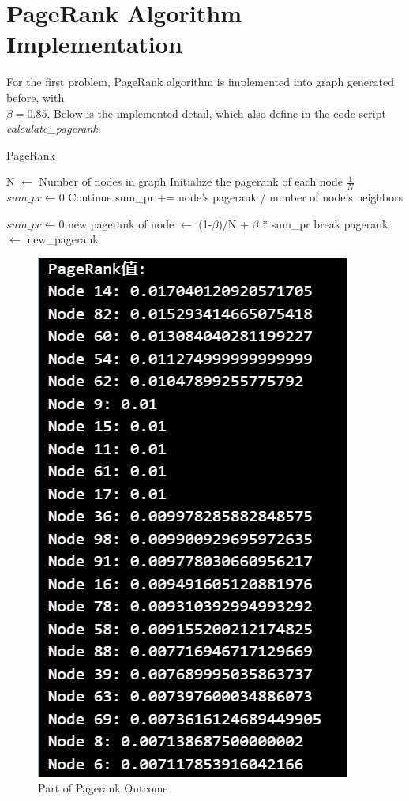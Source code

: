 \documentclass{article}
\begin{document}
	\section*{PageRank Algorithm Implementation}
	For the first problem, PageRank algorithm is implemented into graph generated before, with \\$\beta = 0.85$. Below is the implemented detail, which also define in the code script \textit{calculate\_pagerank}:\\
	
	\begin{algorithm}
		\caption{PageRank}\label{alg:pagerank}
		\begin{algorithmic}
			\State N $\gets $ Number of nodes in graph
			\State Initialize the pagerank of each node $\frac{1}{N}$
					\State $sum\_pr \gets 0$ 
								\State Continue
							\EndIf
							\State sum\_pr += node's pagerank / number of node's neighbors
						
						\EndFor
					\Else
						\State $sum\_pc \gets 0$
					\EndIf
				\State new pagerank of node $\gets$ (1-$\beta$)/N + $\beta$ * sum\_pr
				\EndFor
				\State break
			\EndIf
			\State pagerank $\gets$ new\_pagerank
			\EndFor
		\end{algorithmic}
	\end{algorithm}
	
	\begin{figure}[H]
		\centering
		\includegraphics[scale=0.5]{pagerank.png}
		\caption{Part of Pagerank Outcome}
	\end{figure}
	
\end{document}
